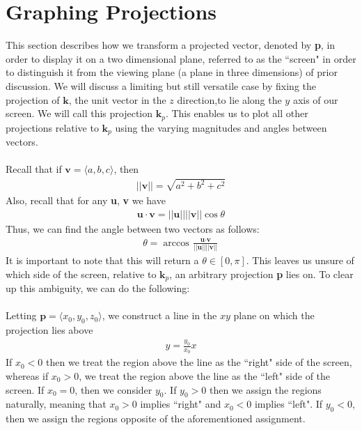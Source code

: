 \documentclass{article}
\begin{document}
\section{Graphing Projections}
This section describes how we transform a projected vector, denoted by \textbf{p}, in order to display it on a two dimensional plane, referred
to as the ``screen" in order to distinguish it from the viewing plane (a plane in three dimensions) of prior discussion.
We will discuss a limiting but still versatile case by fixing the projection of $\textbf{k}$, the unit vector in the $z$ direction,to lie along
the $y$ axis of our screen. We will call this projection $\textbf{k}_p$. This enables us to plot all other projections relative to $\textbf{k}_p$
using the varying magnitudes and angles between vectors.
\\\\
Recall that if $\textbf{v} = \langle a,b,c \rangle$, then
\begin{align*}
||\textbf{v}|| = \sqrt{a^2 + b^2 + c^2}
\end{align*}
Also, recall that for any \textbf{u}, \textbf{v} we have
\begin{align*}
\textbf{u} \cdot \textbf{v} = ||\textbf{u}|| ||\textbf{v}|| \cos{\theta}
\end{align*}
Thus, we can find the angle between two vectors as follows:
\begin{align*}
\theta = \arccos{\frac{\textbf{u} \cdot \textbf{v}}{||\textbf{u}|| ||\textbf{v}||}}
\end{align*}
It is important to note that this will return a $\theta \in [0,\pi]$. This leaves us unsure of which side of the screen, relative to
$\textbf{k}_p$, an arbitrary projection \textbf{p} lies on. To clear up this ambiguity, we can do the following:
\\\\
Letting $\textbf{p} = \langle x_{0},y_{0},z_{0} \rangle$, we construct a line in the $xy$ plane on which the projection lies above
\begin{align*}
y = \frac{y_0}{x_0}x
\end{align*}
If $x_0 < 0$ then we treat the region above the line as the ``right" side of the screen, whereas if $x_0 > 0$, we treat the region above the
line as the ``left" side of the screen. If $x_0 = 0$, then we consider $y_0$. If $y_0 > 0$ then we assign the regions naturally, meaning that
$x_0 > 0$ implies ``right" and $x_0 < 0$ implies ``left". If $y_0 < 0$, then we assign the regions opposite of the aforementioned assignment.
\\\\
\end{document}
